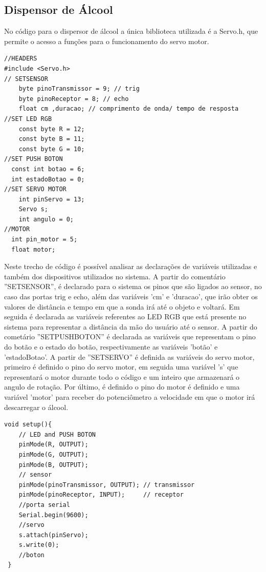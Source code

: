 \documentclass[conference]{IEEEtran}
\begin{document}
    \subsection{Dispensor de Álcool}
    No código para o dispersor de álcool a única biblioteca
    utilizada é a Servo.h, que permite o acesso a funções para o
    funcionamento do servo motor.
    \begin{lstlisting}
//HEADERS
#include <Servo.h>
// SETSENSOR
    byte pinoTransmissor = 9; // trig
    byte pinoReceptor = 8; // echo
	float cm ,duracao; // comprimento de onda/ tempo de resposta
//SET LED RGB
	const byte R = 12;
	const byte B = 11;
  	const byte G = 10;
//SET PUSH BOTON
  const int botao = 6; 
  int estadoBotao = 0;
//SET SERVO MOTOR
	int pinServo = 13;
	Servo s;
	int angulo = 0;
//MOTOR
  int pin_motor = 5;
  float motor;
        \end{lstlisting}
        Neste trecho de código é possível analisar as declarações de
        variáveis utilizadas e também dos dispositivos utilizados no
        sistema. A partir do comentário ”SETSENSOR”, é declarado
        para o sistema os pinos que são ligados ao sensor, no caso das
        portas trig e echo, além das variáveis ’cm’ e 'duracao', 
        que irão obter os valores de distância e tempo em que a sonda irá até o objeto e voltará.
        Em seguida é declarada as variáveis referentes
        ao LED RGB que está presente no sistema para representar a
        distância da mão do usuário até o sensor. A partir do cometário
        ”SETPUSHBOTON” é declarada as variáveis que representam
        o pino do botão e o estado do botão, respectivamente as
        variáveis ’botão’ e ’estadoBotao’. A partir de ”SETSERVO” é
        definida as variáveis do servo motor, primeiro é definido o pino
        do servo motor, em seguida uma variável ’s’ que representará
        o motor durante todo o código e um inteiro que armazenará o
        angulo de rotação. Por último, é definido o pino do motor é
        definido e uma variável ’motor’ para receber do potenciômetro
        a velocidade em que o motor irá descarregar o álcool.
        \begin{lstlisting}
void setup(){
    // LED and PUSH BOTON
    pinMode(R, OUTPUT);
    pinMode(G, OUTPUT);
    pinMode(B, OUTPUT);
    // sensor
    pinMode(pinoTransmissor, OUTPUT); // transmissor
    pinMode(pinoReceptor, INPUT);     // receptor
    //porta serial
    Serial.begin(9600);
    //servo
    s.attach(pinServo);
  	s.write(0);
  	//boton
 }
        \end{lstlisting}
\end{document}
